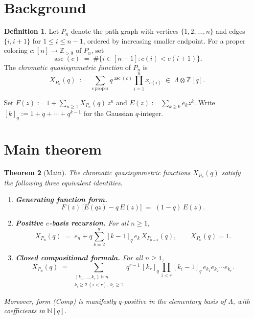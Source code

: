\documentclass[11pt,a4paper]{amsart}
\newtheorem{theorem}{Theorem}
\theoremstyle{definition}
\newtheorem{definition}[theorem]{Definition}
\DeclareMathOperator{\asc}{asc}
\newcommand{\CQF}{X}
\newcommand{\Path}{P}
\newcommand{\Sym}{\Lambda}
\newcommand{\qint}[1]{[#1]_q}
\newcommand{\vDashn}{\vDash}
\begin{document}
\section{Background}\label{sec:background}

\begin{definition}\label{def:cqf}
Let $\Path_n$ denote the path graph with vertices $\{1, 2, \ldots, n\}$
and edges $\{i, i+1\}$ for $1 \le i \le n-1$, ordered by increasing
smaller endpoint. For a proper coloring $c \colon [n] \to \mathbb{Z}_{>0}$
of $\Path_n$, set
\[
  \asc(c) \;=\; \#\bigl\{ i \in [n-1] : c(i) < c(i+1) \bigr\}.
\]
The \emph{chromatic quasisymmetric function} of $\Path_n$ is
\[
  \CQF_{\Path_n}(q)
  \;:=\; \sum_{c\, \text{proper}} q^{\asc(c)} \prod_{i=1}^n x_{c(i)}
  \;\in\; \Sym \otimes \mathbb{Z}[q].
\]
\end{definition}

Set $F(z) := 1 + \sum_{n \ge 1} \CQF_{\Path_n}(q)\, z^n$ and
$E(z) := \sum_{k \ge 0} e_k z^k$. Write $\qint{k} := 1 + q + \cdots + q^{k-1}$
for the Gaussian $q$-integer.

\section{Main theorem}\label{sec:main}

\begin{theorem}[Main]\label{thm:main}
The chromatic quasisymmetric functions $\CQF_{\Path_n}(q)$ satisfy the
following three equivalent identities.
\begin{enumerate}[label=\textup{(\arabic*)},leftmargin=*]
  \item \textbf{Generating function form.}
  \[
    F(z)\,\bigl[E(qz) - q\, E(z)\bigr] \;=\; (1-q)\, E(z). \tag{GF}
  \]
  \item \textbf{Positive $e$-basis recursion.} For all $n \ge 1$,
  \[
    \CQF_{\Path_n}(q)
    \;=\; e_n + q\sum_{k=2}^n \qint{k-1}\, e_k\, \CQF_{\Path_{n-k}}(q),
    \qquad \CQF_{\Path_0}(q) = 1. \tag{Re}
  \]
  \item \textbf{Closed compositional formula.} For all $n \ge 1$,
  \[
    \CQF_{\Path_n}(q)
    \;=\; \sum_{\substack{(k_1,\ldots,k_r) \vDashn n \\ k_i \ge 2\ (i<r),\ k_r \ge 1}}
           q^{r-1}\, \qint{k_r}\, \prod_{i<r} \qint{k_i - 1}\,
           e_{k_1} e_{k_2} \cdots e_{k_r}. \tag{Comp}
  \]
\end{enumerate}
Moreover, form (Comp) is manifestly $q$-positive in the elementary
basis of $\Sym$, with coefficients in $\mathbb{N}[q]$.
\end{theorem}
\end{document}
